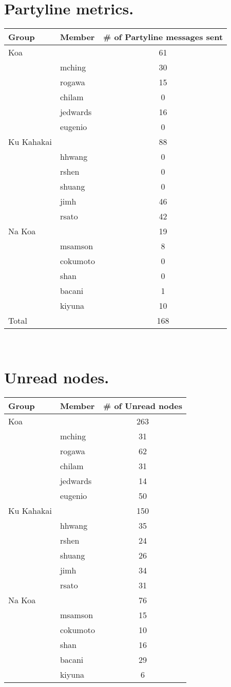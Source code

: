 \section{Partyline metrics.}
\begin{tabular}{|l|l|c|}
\hline
Group&Member&\# of Partyline messages sent\\
\hline
\hline
Koa&&61\\
\hline
&mching&30\\
&rogawa&15\\
&chilam&0\\
&jedwards&16\\
&eugenio&0\\
\hline
\hline
Ku Kahakai&&88\\
\hline
&hhwang&0\\
&rshen&0\\
&shuang&0\\
&jimh&46\\
&rsato&42\\
\hline
\hline
Na Koa&&19\\
\hline
&msamson&8\\
&cokumoto&0\\
&shan&0\\
&bacani&1\\
&kiyuna&10\\
\hline
\hline
Total&&168\\
\hline
\end{tabular} \\


\section{Unread nodes.}
\begin{tabular}{|l|l|c|}
\hline
Group&Member&\# of Unread nodes\\
\hline
\hline
Koa&&263\\
\hline
&mching&31\\
&rogawa&62\\
&chilam&31\\
&jedwards&14\\
&eugenio&50\\
\hline
\hline
Ku Kahakai&&150\\
\hline
&hhwang&35\\
&rshen&24\\
&shuang&26\\
&jimh&34\\
&rsato&31\\
\hline
\hline
Na Koa&&76\\
\hline
&msamson&15\\
&cokumoto&10\\
&shan&16\\
&bacani&29\\
&kiyuna&6\\
\hline
\end{tabular} \\




